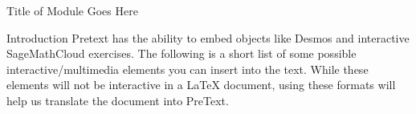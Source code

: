 \documentclass[oneside,10pt]{book}
\begin{document}
\begin{chapter}{Title of Module Goes Here}
\label{module-tag}
\begin{section}{Introduction}
\label{module-tag-introduction}
Pretext has the ability to embed objects like Desmos and interactive SageMathCloud exercises.  The following is a short list of some possible interactive/multimedia elements you can insert into the text.  While these elements will not be interactive in a LaTeX document, using these formats will help us translate the document into PreText.


\end{section}
\end{chapter}
\end{document}
